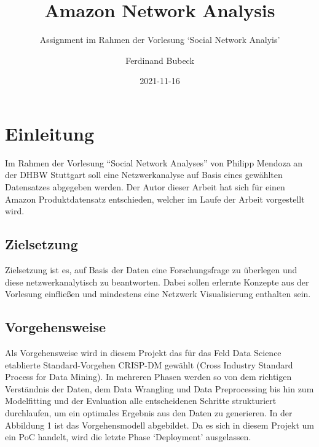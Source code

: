 \documentclass[
  12 pt,
]{article}
\title{Amazon Network Analysis}
\subtitle{Assignment im Rahmen der Vorlesung `Social Network Analyis'}
\author{Ferdinand Bubeck}
\date{2021-11-16}
\begin{document}
\maketitle

\renewcommand*\contentsname{Inhaltsverzeichnis}
{
\setcounter{tocdepth}{3}
\tableofcontents
}
\newpage

\hypertarget{einleitung}{%
\section{Einleitung}\label{einleitung}}

Im Rahmen der Vorlesung ``Social Network Analyses'' von Philipp Mendoza
an der DHBW Stuttgart soll eine Netzwerkanalyse auf Basis eines
gewählten Datensatzes abgegeben werden. Der Autor dieser Arbeit hat sich
für einen Amazon Produktdatensatz entschieden, welcher im Laufe der
Arbeit vorgestellt wird.

\hypertarget{zielsetzung}{%
\subsection{Zielsetzung}\label{zielsetzung}}

Zielsetzung ist es, auf Basis der Daten eine Forschungsfrage zu
überlegen und diese netzwerkanalytisch zu beantworten. Dabei sollen
erlernte Konzepte aus der Vorlesung einfließen und mindestens eine
Netzwerk Visualisierung enthalten sein.

\hypertarget{vorgehensweise}{%
\subsection{Vorgehensweise}\label{vorgehensweise}}

Als Vorgehensweise wird in diesem Projekt das für das Feld Data Science
etablierte Standard-Vorgehen CRISP-DM gewählt (Cross Industry Standard
Process for Data Mining). In mehreren Phasen werden so von dem richtigen
Verständnis der Daten, dem Data Wrangling und Data Preprocessing bis hin
zum Modelfitting und der Evaluation alle entscheidenen Schritte
strukturiert durchlaufen, um ein optimales Ergebnis aus den Daten zu
generieren. In der Abbildung 1 ist das Vorgehensmodell abgebildet. Da es
sich in diesem Projekt um ein PoC handelt, wird die letzte Phase
`Deployment' ausgelassen.
\end{document}
